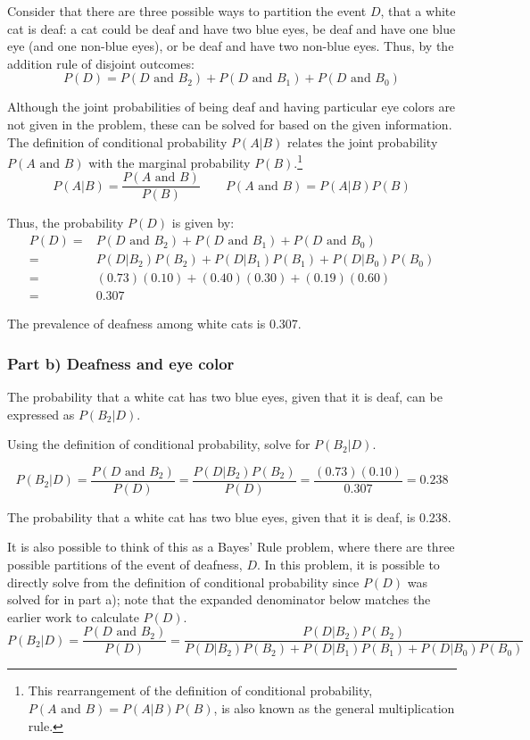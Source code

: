 Consider that there are three possible ways to partition the event $D$, that a white cat is deaf: a cat could be deaf and have two blue eyes, be deaf and have one blue eye (and one non-blue eyes), or be deaf and have two non-blue eyes. Thus, by the addition rule of disjoint outcomes: 
\[P(D) = P(D \textrm{ and } B_2 ) + P(D \textrm{ and } B_1 ) + P(D \textrm{ and } B_0 )\]

Although the joint probabilities of being deaf and having particular eye colors are not given in the problem, these can be solved for based on the given information. The definition of conditional probability $P(A|B)$ relates the joint probability $P(A \textrm{ and } B)$ with the marginal probability $P(B)$.\footnote{This rearrangement of the definition of conditional probability, $P(A \textrm{ and } B) = P(A|B)P(B)$, is also known as the general multiplication rule.}  
\[P(A|B) = \dfrac{P(A \textrm{ and } B)}{P(B)} \qquad P(A \textrm{ and } B) = P(A|B)P(B) \]

Thus, the probability $P(D)$ is given by:
\begin{align*}
P(D) =& P(D \textrm{ and } B_2 ) + P(D \textrm{ and } B_1 ) + P(D \textrm{ and } B_0 ) \\
=& P(D|B_2)P(B_2) + P(D|B_1)P(B_1) + P(D|B_0)P(B_0) \\
=& (0.73)(0.10) + (0.40)(0.30) + (0.19)(0.60) \\
=& 0.307
\end{align*}

The prevalence of deafness among white cats is 0.307.

\subsubsection{Part b) Deafness and eye color}

The probability that a white cat has two blue eyes, given that it is deaf, can be expressed as $P(B_2|D)$. 

\begin{example}{Using the definition of conditional probability, solve for $P(B_2|D)$.}
	
\[P(B_2|D) = \dfrac{P(D \textrm{ and } B_2)}{P(D)} = \dfrac{P(D|B_2)P(B_2)}{P(D)} = \dfrac{(0.73)(0.10)}{0.307} = 0.238 \]

The probability that a white cat has two blue eyes, given that it is deaf, is 0.238.

\end{example}

It is also possible to think of this as a Bayes' Rule problem, where there are three possible partitions of the event of deafness, $D$. In this problem, it is possible to directly solve from the definition of conditional probability since $P(D)$  was solved for in part a); note that the expanded denominator below matches the earlier work to calculate $P(D)$.
\[P(B_2|D) = \dfrac{P(D \textrm{ and } B_2)}{P(D)} = \dfrac{P(D|B_2)P(B_2)}{P(D|B_2)P(B_2) + P(D|B_1)P(B_1) + P(D|B_0)P(B_0)} \]

